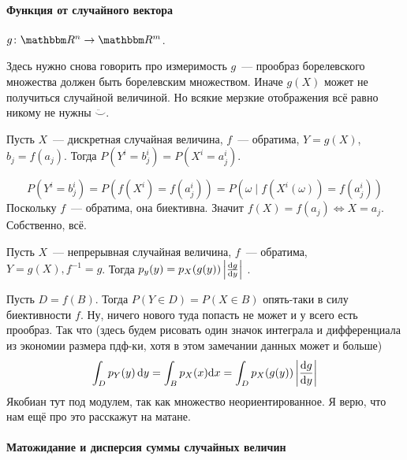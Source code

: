 \documentclass[12pt,ebook]{../../../notes}
\begin{document}
\paragraph{Функция от случайного вектора}
\label{par:stat::funcrand}

\begin{defn}\label{defn:stat::funcrand::funcrand}
  $g \colon \R^n \to \R^m$. 
  \begin{itaux}
    Здесь нужно снова говорить про измеримость $g$~--- прообраз борелевского множества должен
    быть борелевским множеством. Иначе $g(X)$ может не получиться случайной величиной. Но всякие
    мерзкие отображения всё равно никому не нужны $\ddot\smile$.
  \end{itaux}
\end{defn}

\begin{prop}\label{prop:stat::funcrand::disc}
  Пусть $X$~--- дискретная случайная величина, $f$~--- обратима, $Y=g(X)$, $b_j= f(a_j)$.
  Тогда $P(Y^i=b^i_j) =P(X^i=a^i_j)$.
\end{prop}
\begin{itlproof}
  \[
  P(Y^i=b^i_j) = P(f(X^i)= f(a^i_j)) = P({\omega \mid f(X^i(\omega))=f(a^i_j)}) 
  \]
  Поскольку $f$~--- обратима, она биективна. Значит $f(X) = f(a_j) \Leftrightarrow X = a_j$.
  Собственно, всё.
\end{itlproof}
\begin{prop}\label{prop:stat::funcrand::cont}
  Пусть $X$~--- непрерывная случайная величина, $f$~--- обратима, $Y=g(X), f^{-1} = g$.
  Тогда $p_y(y) = p_X(g(y)) \left| \frac{\mathrm{d} g}{\mathrm{d} y} \right|$ .
\end{prop}
\begin{itlproof}
  Пусть $D=f(B)$. Тогда $P(Y \in D) = P(X \in B)$ опять-таки в силу биективности $f$. Ну, ничего
  нового туда попасть не может и у всего есть  прообраз. Так что (здесь будем рисовать один значок
  интеграла и дифференциала из экономии размера пдф-ки, хотя в этом замечании данных может и больше)
  \begin{align*}
    \int_D p_Y(y) \, \mathrm{d} y  = \int_B  p_X(x) \mathrm{d} x 
    = \int_D  p_X(g(y)) \left| \frac{\mathrm{d} g}{\mathrm{d} y} \right|  
  \end{align*}
  Якобиан тут под модулем, так как множество неориентированное. Я верю, что нам ещё про это
  расскажут на матане.
\end{itlproof}

\paragraph{Матожидание и дисперсия суммы случайных величин}
\label{par:stat::randsum}
\end{document}
